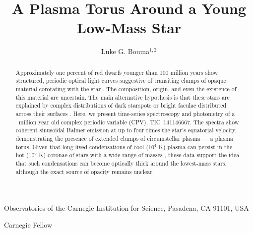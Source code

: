 \documentclass{nature3}
\title{A Plasma Torus Around a Young Low-Mass Star}
\newcommand{\carnegie}{Observatories of the Carnegie Institution for Science, Pasadena, CA 91101, USA}
\begin{document}
\author{Luke G. Bouma$^{1,2}$}

\maketitle

\scriptsize
\begin{affiliations}
\item \carnegie
\item Carnegie Fellow
\end{affiliations}
\normalsize


\begin{abstract}
\normalfont
Approximately one percent of red dwarfs younger than 100 million years
show structured, periodic optical light curves suggestive of
transiting clumps of opaque material corotating with the star
\cite{Rebull2016,Stauffer2017,Rebull2018,Bouma2024}.
The composition, origin, and even the existence of this material are
uncertain. The main alternative hypothesis is that these stars are
explained by complex distributions of dark starspots or bright
faculae distributed across their surfaces \cite{Koen2021}.  Here, we
present time-series spectroscopy and photometry of a \stagemyr\
million year old complex periodic variable (CPV), TIC~141146667. The
spectra show coherent sinusoidal Balmer emission at up to four times
the star's equatorial velocity, demonstrating the presence of
extended clumps of circumstellar plasma --- a plasma torus.  Given
that long-lived condensations of cool ($10^4$ K) plasma can persist
in the hot ($10^6$ K) coronae of stars with a wide range of masses
\cite{CollierCameron1989,Townsend2005,Dunstone2006,Petit2013,Waugh2022,Daley-Yates2024},
these data support the idea that such condensations can become
optically thick around the lowest-mass stars, although the exact
source of opacity remains unclear.
\end{abstract}

\maketitle

\end{document}

